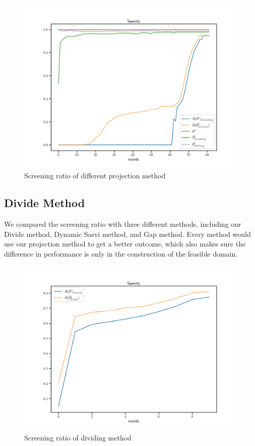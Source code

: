 	\begin{figure}[htbp]
	\begin{center}	
	\includegraphics[width = \linewidth]{pic/sparse_proj}
	\caption{Screening ratio of different projection method}
	\end{center}	
	\end{figure}

\subsection{Divide Method}
We compared the screening ratio with three different methods, including our Divide method, Dynamic Sasvi method, and Gap method. Every method would use our projection method to get a better outcome, which also makes sure the difference in performance is only in the construction of the feasible domain. 
	\begin{figure}[h]
	\begin{center}	
	\includegraphics[width = \linewidth]{pic/screening_divide_ratio_long}
	\caption{Screening ratio of dividing method}
	\end{center}	
	\end{figure}

